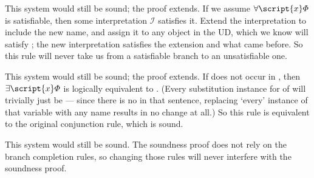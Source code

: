 \begin{earg}
\item This system would still be sound; the proof extends. If we assume $\forall\script{x}\metaA{}$ is satisfiable, then some interpretation $\mathcal{I}$ satisfies it. Extend the interpretation to include the new name, and assign it to any object in the UD, which we know will satisfy \metaA{}; the new interpretation satisfies the extension and what came before. So this rule will never take us from a satisfiable branch to an unsatisfiable one.





\item This system would still be sound; the proof extends. If  does not occur in \metaA{}, then $\exists\script{x}\metaA{}$ is logically equivalent to \metaA{}. (Every substitution instance for  of \metaA{} will trivially just be \metaA{}--- since there is no  in that sentence, replacing `every' instance of that variable with any name results in no change at all.) So this rule is equivalent to the original conjunction rule, which is sound.

%
%
%
%
%

\item This system would still be sound. The soundness proof does not rely on the branch completion rules, so changing those rules will never interfere with the soundness proof.






\end{earg}
